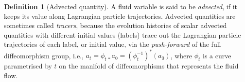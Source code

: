 \documentclass[11pt, oneside]{article}   	%
\numberwithin{equation}{section}
\theoremstyle{plain}
\theoremstyle{definition}
\newtheorem{definition}[theorem]{Definition}
\theoremstyle{remark}
\newcommand{\<}{\langle}
\renewcommand{\>}{\rangle}
\begin{document}

\begin{definition}[Advected quantity]
A fluid variable is said to be \emph{advected}, if it keeps its value along Lagrangian particle trajectories. Advected quantities are sometimes called \emph{tracers}, because the evolution histories of scalar advected quantities with different initial values (labels) trace out the Lagrangian particle trajectories of each label, or initial value, via the \emph{push-forward} of the full diffeomorphism group, i.e., $a_t=\phi_{t\,*}a_0= (\phi_t^{-1})^*(a_0)$, where $\phi_t$ is a curve parametrised by $t$ on the manifold of diffeomorphisms that represents the fluid flow.
\end{definition}\smallskip
\end{document}
